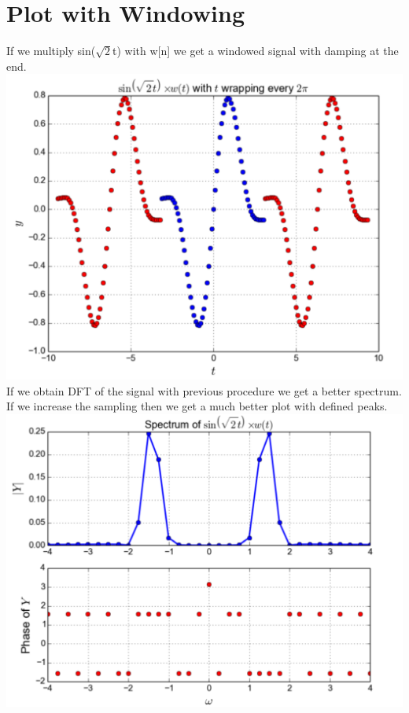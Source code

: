 \documentclass[10pt,english, openany]{book}
\begin{document}
\section{Plot with Windowing}
If we multiply sin($ \sqrt{2}$t) with w[n] we get a windowed signal with damping at the end.\\
{\centering \includegraphics[scale=0.3]{Figure3.png}}\\
If we obtain DFT of the signal with previous procedure we get a better spectrum. If we increase the sampling then we get a much better plot with defined peaks.\\
{\centering \includegraphics[scale=0.3]{Figure4.png}}\\
\end{document}
